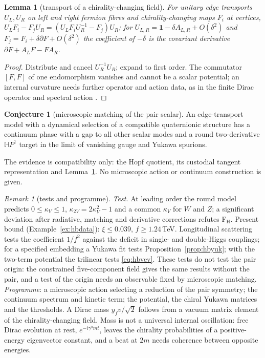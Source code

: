 \documentclass[aps,pra,onecolumn,superscriptaddress,nofootinbib,10pt]{revtex4-2}
\newtheorem{lemma}[theorem]{Lemma}
\theoremstyle{definition}
\newtheorem{conjecture}[theorem]{Conjecture}
\theoremstyle{remark}
\newtheorem{remark}[theorem]{Remark}
\newcommand{\HH}{\mathbb{H}}
\begin{document}
\begin{lemma}[transport of a chirality-changing field]\label{lem:hbtransport}
For unitary edge transports $U_L,U_R$ on left and right fermion fibres and chirality-changing maps $F_i$ at
vertices, $U_LF_i-F_jU_R=(U_LF_iU_R^{-1}-F_j)U_R$; for $U_{L,R}=\mathbf1-\delta A_{L,R}+O(\delta^2)$ and $F_j=F_i+\delta\partial F+O(\delta^2)$ the coefficient of $-\delta$
is the covariant derivative $\partial F+A_LF-FA_R$.
\end{lemma}
\begin{proof}
Distribute and cancel $U_R^{-1}U_R$; expand to first order.  The commutator $[F,F]$ of one endomorphism vanishes and
cannot be a scalar potential; an internal curvature needs further operator and action data, as in the
finite Dirac operator and spectral action \cite{n7:Connes,n7:CC,n7:CC12}.
\end{proof}

\begin{conjecture}[microscopic matching of the pair scalar]\label{conj:hbmicro}
An edge-transport model with a dynamical selection of a compatible quaternionic structure has a
continuum phase with a gap to all other scalar modes and a round two-derivative $\HH P^1$ target in the limit
of vanishing gauge and Yukawa spurions.
\end{conjecture}
\noindent The evidence is compatibility only: the Hopf quotient, its custodial tangent representation and
Lemma~\ref{lem:hbtransport}.  No microscopic action or continuum construction is given.

\begin{remark}[tests and programme]\label{rem:hbtests}
\emph{Test.}  At leading order the round model predicts $0\le\kappa_V\le1$, $\kappa_{2V}=2\kappa_V^2-1$ and a common $\kappa_V$ for $W$ and $Z$; a
significant deviation after radiative, matching and derivative corrections refutes F$_{\mathrm H}$.  Present bound
(Example~\ref{ex:hbdata}): $\xi\le0.039$, $f\ge1.24$\,TeV.  Longitudinal scattering tests the coefficient $1/f^2$ against the
deficit in single- and double-Higgs couplings; for a specified embedding a Yukawa fit tests
Proposition~\ref{prop:hbyuk}; with the two-term potential the trilinear tests \eqref{eq:hbvev}.  These tests do not test the
pair origin: the constrained five-component field gives the same results without the pair, and a test of
the origin needs an observable fixed by microscopic matching.  \emph{Programme}: a microscopic action selecting
a reduction of the pair symmetry; the continuum spectrum and kinetic term; the potential, the chiral
Yukawa matrices and the thresholds.  A Dirac mass $y_fv/\sqrt2$ follows from a vacuum matrix element of the
chirality-changing field.  Mass is not a universal internal oscillation: free Dirac evolution at rest,
$e^{-i\gamma^0mt}$, leaves the chirality probabilities of a positive-energy eigenvector constant, and a beat at $2m$
needs coherence between opposite energies.
\end{remark}
\end{document}
